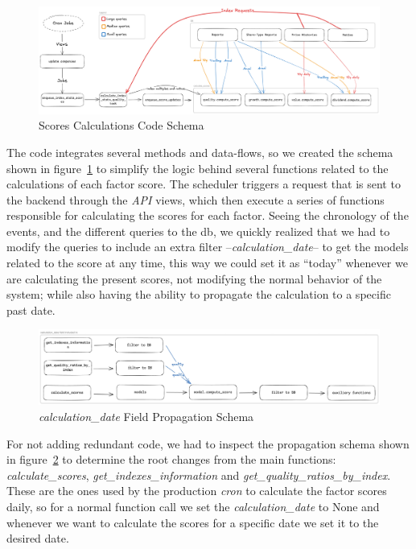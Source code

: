 \documentclass[11pt,english,a4paper,hidelinks]{book}
\begin{document}
\begin{figure}[H]
    \centering
    \includegraphics[width=1\textwidth]{images/tweenvest/scores schema.png}
    \caption{Scores Calculations Code Schema}
    \label{fig:scores_schema}
\end{figure}

\noindent The code integrates several methods and data-flows, so we created the schema shown in figure~\ref{fig:scores_schema} to simplify the logic behind several functions related to the calculations of each factor score. The scheduler triggers a request that is sent to the backend through the \textit{API} views, which then execute a series of functions responsible for calculating the scores for each factor. Seeing the chronology of the events, and the different queries to the \acrshort{db}, we quickly realized that we had to modify the queries to include an extra filter --\textit{calculation\_date}-- to get the models related to the score at any time, this way we could set it as ``today'' whenever we are calculating the present scores, not modifying the normal behavior of the system; while also having the ability to propagate the calculation to a specific past date.

\begin{figure}[H]
    \centering
    \includegraphics[width=1\textwidth]{images/tweenvest/Propagation Schema.png}
    \caption{\textit{calculation\_date} Field Propagation Schema}
    \label{fig:propagation_schema}
\end{figure}

\noindent For not adding redundant code, we had to inspect the propagation schema shown in figure~\ref{fig:propagation_schema} to determine the root changes from the main functions: \textit{calculate\_scores}, \textit{get\_indexes\_information} and \textit{get\_quality\_ratios\_by\_index}. These are the ones used by the production \textit{\acrshort{cron}} to calculate the factor scores daily, so for a normal function call we set the \textit{calculation\_date} to None and whenever we want to calculate the scores for a specific date we set it to the desired date. 
\end{document}
